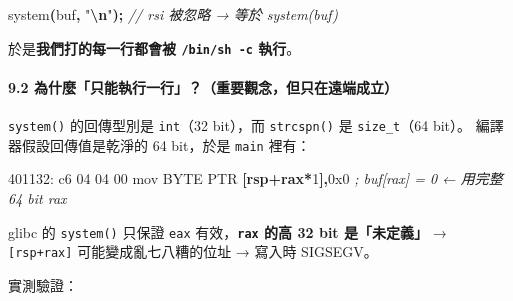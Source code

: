 \documentclass[10pt,a4paper]{article}
\newenvironment{Shaded}{\begin{snugshade}}{\end{snugshade}}
\newcommand{\BaseNTok}[1]{\textcolor[rgb]{0.00,0.00,0.81}{#1}}
\newcommand{\CommentTok}[1]{\textcolor[rgb]{0.56,0.35,0.01}{\textit{#1}}}
\newcommand{\DataTypeTok}[1]{\textcolor[rgb]{0.13,0.29,0.53}{#1}}
\newcommand{\DecValTok}[1]{\textcolor[rgb]{0.00,0.00,0.81}{#1}}
\newcommand{\KeywordTok}[1]{\textcolor[rgb]{0.13,0.29,0.53}{\textbf{#1}}}
\newcommand{\NormalTok}[1]{#1}
\newcommand{\OperatorTok}[1]{\textcolor[rgb]{0.81,0.36,0.00}{\textbf{#1}}}
\newcommand{\SpecialCharTok}[1]{\textcolor[rgb]{0.81,0.36,0.00}{\textbf{#1}}}
\newcommand{\StringTok}[1]{\textcolor[rgb]{0.31,0.60,0.02}{#1}}
\renewenvironment{Shaded}{%
  \def\FrameCommand{\fboxsep=3.2pt\colorbox{shadecolor}}%
  \MakeFramed{\advance\hsize-\width\FrameRestore\small}%
}{%
  \endMakeFramed
}
\begin{document}
\begin{Shaded}
\begin{Highlighting}[]
\NormalTok{system}\OperatorTok{(}\NormalTok{buf}\OperatorTok{,} \StringTok{"}\SpecialCharTok{\textbackslash{}n}\StringTok{"}\OperatorTok{);}      \CommentTok{// rsi 被忽略 → 等於 system(buf)}
\end{Highlighting}
\end{Shaded}

於是\textbf{我們打的每一行都會被 \texttt{/\allowbreak{}bin/\allowbreak{}sh\ \allowbreak{}-\allowbreak{}c} 執行}。

\paragraph{9.2
為什麼「只能執行一行」？（重要觀念，但只在遠端成立）}\label{ux70baux4ec0ux9ebcux53eaux80fdux57f7ux884cux4e00ux884cux91cdux8981ux89c0ux5ff5ux4f46ux53eaux5728ux9060ux7aefux6210ux7acb}

\texttt{system()} 的回傳型別是 \texttt{int}（32 bit），而
\texttt{strcspn()} 是 \texttt{size\_\allowbreak{}t}（64 bit）。
編譯器假設回傳值是乾淨的 64 bit，於是 \texttt{main} 裡有：

\begin{Shaded}
\begin{Highlighting}[]
\NormalTok{  401132: c6 }\DecValTok{04} \DecValTok{04} \DecValTok{00}\NormalTok{   mov }\DataTypeTok{BYTE} \DataTypeTok{PTR} \OperatorTok{[}\KeywordTok{rsp}\OperatorTok{+}\KeywordTok{rax}\OperatorTok{*}\DecValTok{1}\OperatorTok{],}\BaseNTok{0x0}   \CommentTok{; buf[rax] = 0  ← 用完整 64 bit rax}
\end{Highlighting}
\end{Shaded}

glibc 的 \texttt{system()} 只保證 \texttt{eax}
有效，\textbf{\texttt{rax} 的高 32 bit 是「未定義」} →
\texttt{{[}rsp+rax{]}} 可能變成亂七八糟的位址 → 寫入時 SIGSEGV。

實測驗證：
\end{document}
